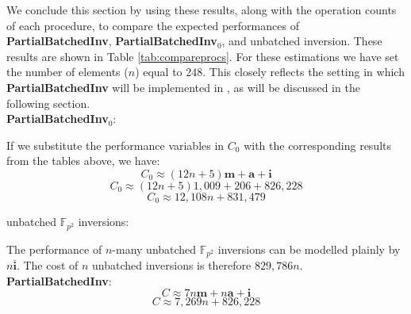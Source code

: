 We conclude this section by using these results, along with the operation counts of each procedure, to compare the expected performances of \textbf{PartialBatchedInv}, \textbf{PartialBatchedInv}$_0$, and unbatched inversion. These results are shown in Table \ref{tab:compareprocs}. For these estimations we have set the number of elements ($n$) equal to 248. This closely reflects the setting in which \textbf{PartialBatchedInv} will be implemented in \sidh, as will be discussed in the following section.\\

\noindent
\textbf{PartialBatchedInv}$_0$:
	
	If we substitute the performance variables in $C_0$ with the corresponding results from the tables above, we have:
$$
C_0 \approx (12n + 5)\textbf{m} + \textbf{a} + \textbf{i}
$$
$$
C_0 \approx (12n + 5)1,009 + 206 + 826,228
$$
$$
C_0 \approx 12,108n + 831,479 
$$

\noindent
unbatched $\mathbb{F}_{p^2}$ inversions:

	The performance of $n$-many unbatched $\mathbb{F}_{p^2}$ inversions can be modelled plainly by $n\bar{\textbf{i}}$. The cost of $n$ unbatched inversions is therefore $829,786n$.\\

\noindent
\textbf{PartialBatchedInv}:
$$
C \approx 7n\textbf{m} + n\textbf{a} + \textbf{i}
$$
$$
C \approx 7,269n + 826,228
$$

\begin{center}
\end{center}

